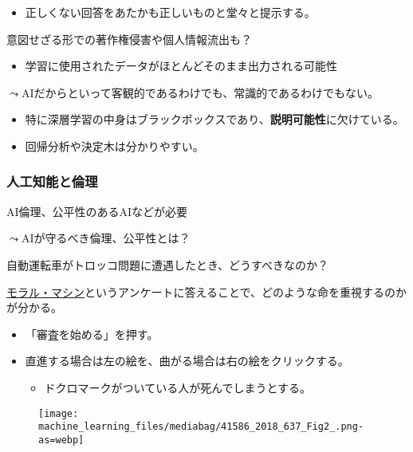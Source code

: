 \documentclass[
  xelatex,
  ja=standard]{bxjsarticle}
\providecommand{\tightlist}{%
  \setlength{\itemsep}{0pt}\setlength{\parskip}{0pt}}\usepackage{longtable,booktabs,array}
\begin{document}
\begin{itemize}
\tightlist
\item
  正しくない回答をあたかも正しいものと堂々と提示する。
\end{itemize}

意図せざる形での著作権侵害や個人情報流出も？

\begin{itemize}
\tightlist
\item
  学習に使用されたデータがほとんどそのまま出力される可能性
\end{itemize}

\(\leadsto\)AIだからといって客観的であるわけでも、常識的であるわけでもない。

\begin{itemize}
\tightlist
\item
  特に深層学習の中身はブラックボックスであり、\textbf{説明可能性}に欠けている。
\item
  回帰分析や決定木は分かりやすい。
\end{itemize}

\hypertarget{ux4ebaux5de5ux77e5ux80fdux3068ux502bux7406}{%
\subsubsection{人工知能と倫理}\label{ux4ebaux5de5ux77e5ux80fdux3068ux502bux7406}}

AI倫理、公平性のあるAIなどが必要

\(\leadsto\)AIが守るべき倫理、公平性とは？

自動運転車がトロッコ問題に遭遇したとき、どうすべきなのか？

\href{https://www.moralmachine.net/hl/ja}{モラル・マシン}というアンケートに答えることで、どのような命を重視するのかが分かる。

\begin{itemize}
\tightlist
\item
  「審査を始める」を押す。
\item
  直進する場合は左の絵を、曲がる場合は右の絵をクリックする。

  \begin{itemize}
  \tightlist
  \item
    ドクロマークがついている人が死んでしまうとする。
  \end{itemize}
\end{itemize}

\begin{figure}[htpb]

{\centering \texttt{[image: machine\_learning\_files/mediabag/41586\_2018\_637\_Fig2\_.png-as=webp]}

}

\caption{\citet{awad2018}}

\end{figure}
\end{document}
